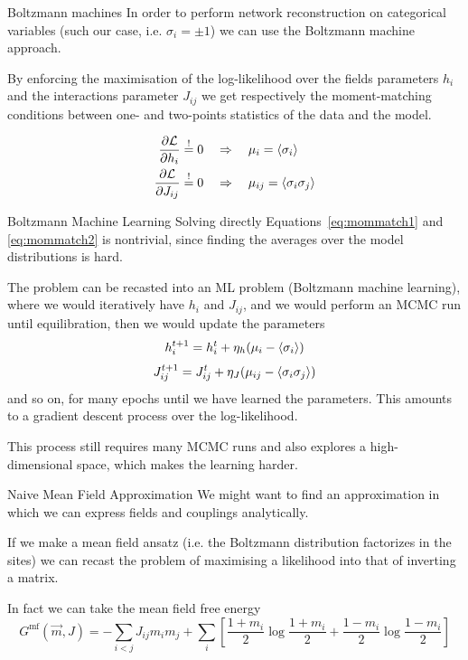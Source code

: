 \documentclass[handout]{beamer}
\newcommand{\reqeq}{\overset{!}{=}}
\begin{document}
\begin{frame}{Boltzmann machines}
    In order to perform network reconstruction on categorical variables (such
    our case, i.e. $\sigma_i=\pm 1$) we can use the \alert{Boltzmann machine}
    approach.

    By enforcing the maximisation of the log-likelihood over the \alert{fields}
    parameters $h_i$ and the {interactions} parameter $J_{ij}$ we get
    respectively the \alert{moment-matching} conditions between one- and
    two-points statistics of the data and the model. \cite[89]{spddm}

    \begin{align}
        \pdv{\mathcal{L}}{h_i} \reqeq 0 \quad &\Rightarrow \quad \mu_i =
        \expval{\sigma_i} \label{eq:mommatch1}\\
        \pdv{\mathcal{L}}{J_{ij}} \reqeq 0 \quad &\Rightarrow \quad \mu_{ij} =
        \expval{\sigma_i\sigma_j} \label{eq:mommatch2}
    \end{align}
\end{frame}

\begin{frame}{Boltzmann Machine Learning}
    Solving directly Equations~\ref{eq:mommatch1} and \ref{eq:mommatch2} is
    nontrivial, since finding the averages over the model distributions is hard.

    The problem can be recasted into an ML problem (\alert{Boltzmann machine
    learning}),
    where we would iteratively have $h_i$ and $J_{ij}$, and we would perform an
    MCMC run until equilibration, then we would update the parameters
    $$
    h_i^{t+1} = h_i^t + \eta_h (\mu_i - \expval{\sigma_i})
    $$
    $$
    J_{ij}^{t+1} = J_{ij}^t + \eta_J (\mu_{ij} - \expval{\sigma_i\sigma_j})
    $$
    and so on, for many epochs until we have learned the parameters.
    This amounts to a gradient descent process over the log-likelihood.

    This process still requires many MCMC runs and also explores a
    high-dimensional space, which makes the learning harder.
\end{frame}

\begin{frame}{Naive Mean Field Approximation}
    We might want to find an approximation in which we can express
    \alert{fields} and \alert{couplings} analytically.

    If we make a \alert{mean field} ansatz (i.e. the Boltzmann distribution
    factorizes in the sites) we can recast the problem of maximising a
    likelihood into that of inverting a matrix.

    In fact we can take the mean field free energy
    \begin{equation}
        G^{\text{mf}}(\vec m, J) = - \sum_{i<j} J_{ij} m_i m_j +
        \sum_i \left[ \frac{1+m_i}{2} \log \frac{1+m_i}{2} + \frac{1-m_i}{2}
        \log \frac{1-m_i}{2} \right]
        \label{eq:mf_free}
    \end{equation}
\end{frame}
\end{document}
